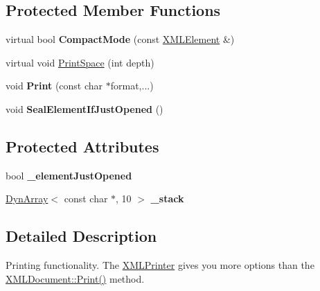 \subsection*{Protected Member Functions}
\begin{DoxyCompactItemize}
\item 
virtual bool {\bfseries Compact\+Mode} (const \hyperlink{classtinyxml2_1_1_x_m_l_element}{X\+M\+L\+Element} \&)\hypertarget{classtinyxml2_1_1_x_m_l_printer_a38e1ed5a779bdf63eda9e808f7a6de66}{}\label{classtinyxml2_1_1_x_m_l_printer_a38e1ed5a779bdf63eda9e808f7a6de66}

\item 
virtual void \hyperlink{classtinyxml2_1_1_x_m_l_printer_a01148e2ebe6776e38c5a3e41bc5feb74}{Print\+Space} (int depth)
\item 
void {\bfseries Print} (const char $\ast$format,...)\hypertarget{classtinyxml2_1_1_x_m_l_printer_ab30210a7f32e45634e7a45137bf6fdf6}{}\label{classtinyxml2_1_1_x_m_l_printer_ab30210a7f32e45634e7a45137bf6fdf6}

\item 
void {\bfseries Seal\+Element\+If\+Just\+Opened} ()\hypertarget{classtinyxml2_1_1_x_m_l_printer_ac6e2c72c5d796f5b4de6ce81ca95e3fa}{}\label{classtinyxml2_1_1_x_m_l_printer_ac6e2c72c5d796f5b4de6ce81ca95e3fa}

\end{DoxyCompactItemize}
\subsection*{Protected Attributes}
\begin{DoxyCompactItemize}
\item 
bool {\bfseries \+\_\+element\+Just\+Opened}\hypertarget{classtinyxml2_1_1_x_m_l_printer_ac07169d58b465214a2b1fa306e617c26}{}\label{classtinyxml2_1_1_x_m_l_printer_ac07169d58b465214a2b1fa306e617c26}

\item 
\hyperlink{classtinyxml2_1_1_dyn_array}{Dyn\+Array}$<$ const char $\ast$, 10 $>$ {\bfseries \+\_\+stack}\hypertarget{classtinyxml2_1_1_x_m_l_printer_a99d59e67e084714541bee3ae43884bef}{}\label{classtinyxml2_1_1_x_m_l_printer_a99d59e67e084714541bee3ae43884bef}

\end{DoxyCompactItemize}


\subsection{Detailed Description}
Printing functionality. The \hyperlink{classtinyxml2_1_1_x_m_l_printer}{X\+M\+L\+Printer} gives you more options than the \hyperlink{classtinyxml2_1_1_x_m_l_document_a686ea28672c0e0c60383ec28148c1ac0}{X\+M\+L\+Document\+::\+Print()} method.

